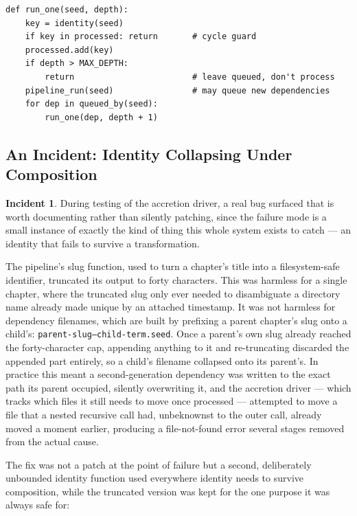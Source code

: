 \documentclass[11pt]{article}
\theoremstyle{definition}
\newtheorem{incident}{Incident}
\begin{document}
\begin{lstlisting}[caption={The accretion driver, simplified}]
def run_one(seed, depth):
    key = identity(seed)
    if key in processed: return       # cycle guard
    processed.add(key)
    if depth > MAX_DEPTH:
        return                        # leave queued, don't process
    pipeline_run(seed)                # may queue new dependencies
    for dep in queued_by(seed):
        run_one(dep, depth + 1)
\end{lstlisting}

\subsection{An Incident: Identity Collapsing Under Composition}
\label{sec:incident}

\begin{incident}
During testing of the accretion driver, a real bug surfaced that is
worth documenting rather than silently patching, since the failure
mode is a small instance of exactly the kind of thing this whole
system exists to catch --- an identity that fails to survive a
transformation.
\end{incident}

The pipeline's slug function, used to turn a chapter's title into a
filesystem-safe identifier, truncated its output to forty characters.
This was harmless for a single chapter, where the truncated slug only
ever needed to disambiguate a directory name already made unique by an
attached timestamp. It was not harmless for dependency filenames, which
are built by prefixing a parent chapter's slug onto a child's:
\texttt{parent-slug--child-term.seed}. Once a parent's own slug already
reached the forty-character cap, appending anything to it and
re-truncating discarded the appended part entirely, so a child's
filename collapsed onto its parent's. In practice this meant a
second-generation dependency was written to the exact path its parent
occupied, silently overwriting it, and the accretion driver --- which
tracks which files it still needs to move once processed --- attempted
to move a file that a nested recursive call had, unbeknownst to the
outer call, already moved a moment earlier, producing a file-not-found
error several stages removed from the actual cause.

The fix was not a patch at the point of failure but a second,
deliberately unbounded identity function used everywhere identity needs
to survive composition, while the truncated version was kept for the
one purpose it was always safe for:
\end{document}
